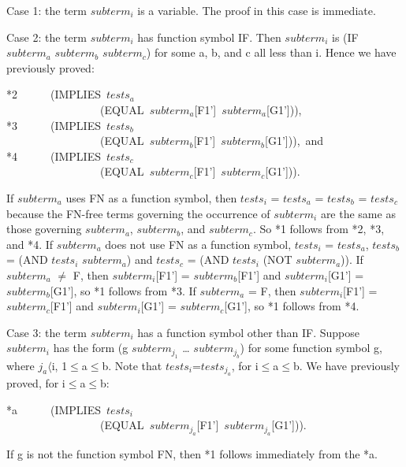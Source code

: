 \documentclass[11pt]{book}
\newenvironment{pubasis}{\begin{flushleft}\ttfamily\small}{\normalsize\rmfamily\end{flushleft}}
\begin{document}
Case 1:  the term $subterm_{i}$ is a variable.  The proof in this case is immediate.

Case 2:  the term $subterm_{i}$ has function symbol IF.  Then $subterm_{i}$
is (IF $subterm_{a}$ $subterm_{b}$ $subterm_{c}$) for some a, b, and c
all less than i.  Hence we have previously proved:
\begin{pubasis}
*2~~~~~~(IMPLIES~$tests_{a}$\\
~~~~~~~~~~~~~~~~~(EQUAL~$subterm_{a}$[F1']~$subterm_{a}$[G1'])),\\

*3~~~~~~(IMPLIES~$tests_{b}$\\
~~~~~~~~~~~~~~~~~(EQUAL~$subterm_{b}$[F1']~$subterm_{b}$[G1'])),~and\\

*4~~~~~~(IMPLIES~$tests_{c}$\\
~~~~~~~~~~~~~~~~~(EQUAL~$subterm_{c}$[F1']~$subterm_{c}$[G1'])).\\
\end{pubasis}
If $subterm_{a}$ uses FN as a function symbol, then $tests_{i}$ = $tests_{a}$ =
$tests_{b}$ = $tests_{c}$ because the FN-free terms governing the occurrence
of $subterm_{i}$ are the same as those governing $subterm_{a}$, $subterm_{b}$, and
$subterm_{c}$.  So *1 follows from *2, *3, and *4.  If $subterm_{a}$
does not use FN as a function symbol, $tests_{i}$ = $tests_{a}$, $tests_{b}$ =
(AND $tests_{i}$ $subterm_{a}$) and $tests_{c}$ = (AND $tests_{i}$ (NOT $subterm_{a}$)).
If $subterm_{a}$ $\neq$ F, then $subterm_{i}$[F1'] = $subterm_{b}$[F1'] and
$subterm_{i}$[G1'] = $subterm_{b}$[G1'], so *1 follows from *3.  If $subterm_{a}$ = F,
then $subterm_{i}$[F1'] = $subterm_{c}$[F1'] and $subterm_{i}$[G1'] =
$subterm_{c}$[G1'], so *1 follows from *4.

Case 3:  the term $subterm_{i}$ has a function symbol other than IF.
Suppose $subterm_{i}$ has the form (g $subterm_{j_{1}}$ \ldots{} $subterm_{j_{b}}$)
for some function symbol g, where $j_{a} \langle$i, 1$\leq$a$\leq$b.
Note that $tests_{i}$=$tests_{j_{a}}$, for i$\leq$a$\leq$b.  We
have previously proved, for i$\leq$a$\leq$b:
\begin{pubasis}
*a~~~~~~(IMPLIES~$tests_{i}$\\
~~~~~~~~~~~~~~~~~(EQUAL~$subterm_{j_{a}}$[F1']~$subterm_{j_{a}}$[G1'])).\\
\end{pubasis}
If g is not the function symbol FN, then *1 follows immediately from the *a.
\end{document}
